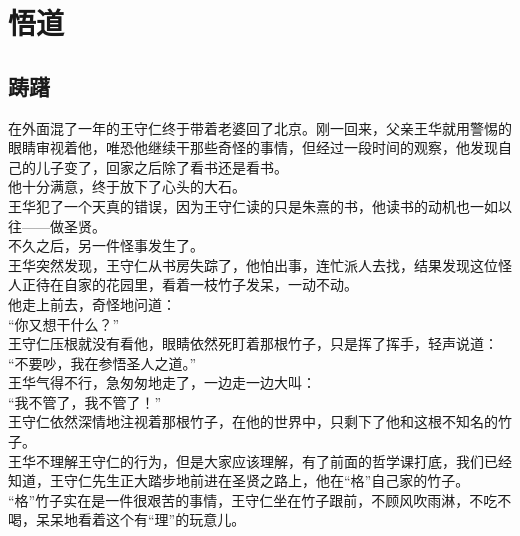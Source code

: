 \section{悟道}
\ifnum{}
	\begin{multicols}{\theparacolNo}
\fi
\subsection{踌躇}
在外面混了一年的王守仁终于带着老婆回了北京。刚一回来，父亲王华就用警惕的眼睛审视着他，唯恐他继续干那些奇怪的事情，但经过一段时间的观察，他发现自己的儿子变了，回家之后除了看书还是看书。\\

他十分满意，终于放下了心头的大石。\\

王华犯了一个天真的错误，因为王守仁读的只是朱熹的书，他读书的动机也一如以往——做圣贤。\\

不久之后，另一件怪事发生了。\\

王华突然发现，王守仁从书房失踪了，他怕出事，连忙派人去找，结果发现这位怪人正待在自家的花园里，看着一枝竹子发呆，一动不动。\\

他走上前去，奇怪地问道：\\

“你又想干什么？”\\

王守仁压根就没有看他，眼睛依然死盯着那根竹子，只是挥了挥手，轻声说道：\\

“不要吵，我在参悟圣人之道。”\\

王华气得不行，急匆匆地走了，一边走一边大叫：\\

“我不管了，我不管了！”\\

王守仁依然深情地注视着那根竹子，在他的世界中，只剩下了他和这根不知名的竹子。\\

王华不理解王守仁的行为，但是大家应该理解，有了前面的哲学课打底，我们已经知道，王守仁先生正大踏步地前进在圣贤之路上，他在“格”自己家的竹子。\\

“格”竹子实在是一件很艰苦的事情，王守仁坐在竹子跟前，不顾风吹雨淋，不吃不喝，呆呆地看着这个有“理”的玩意儿。\\


\end{multicols}
